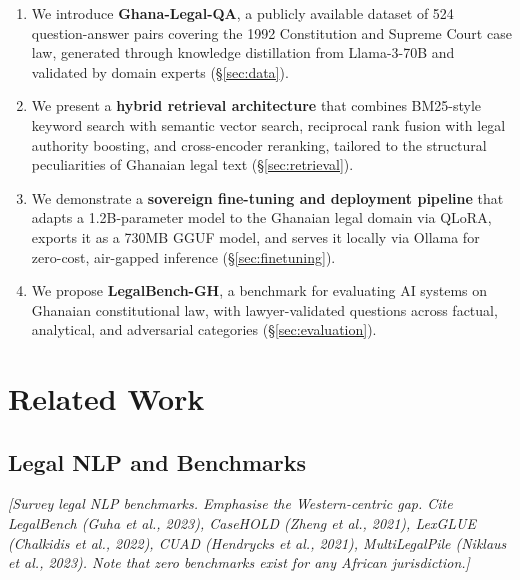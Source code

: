 \documentclass[11pt]{article}
\begin{document}
\begin{enumerate}
    \item We introduce \textbf{Ghana-Legal-QA}, a publicly available
    dataset of 524 question-answer pairs covering the 1992 Constitution
    and Supreme Court case law, generated through knowledge distillation
    from Llama-3-70B and validated by domain experts (\S\ref{sec:data}).

    \item We present a \textbf{hybrid retrieval architecture} that
    combines BM25-style keyword search with semantic vector search,
    reciprocal rank fusion with legal authority boosting, and cross-encoder
    reranking, tailored to the structural peculiarities of Ghanaian legal
    text (\S\ref{sec:retrieval}).

    \item We demonstrate a \textbf{sovereign fine-tuning and deployment
    pipeline} that adapts a 1.2B-parameter model to the Ghanaian legal
    domain via QLoRA, exports it as a 730MB GGUF model, and serves it
    locally via Ollama for zero-cost, air-gapped inference
    (\S\ref{sec:finetuning}).

    \item We propose \textbf{LegalBench-GH}, a benchmark for evaluating
    AI systems on Ghanaian constitutional law, with lawyer-validated
    questions across factual, analytical, and adversarial categories
    (\S\ref{sec:evaluation}).
\end{enumerate}


\section{Related Work}
\label{sec:related}

\subsection{Legal NLP and Benchmarks}


\textit{[Survey legal NLP benchmarks. Emphasise the Western-centric gap.
Cite LegalBench (Guha et al., 2023), CaseHOLD (Zheng et al., 2021),
LexGLUE (Chalkidis et al., 2022), CUAD (Hendrycks et al., 2021),
MultiLegalPile (Niklaus et al., 2023). Note that zero benchmarks exist
for any African jurisdiction.]}
\end{document}

